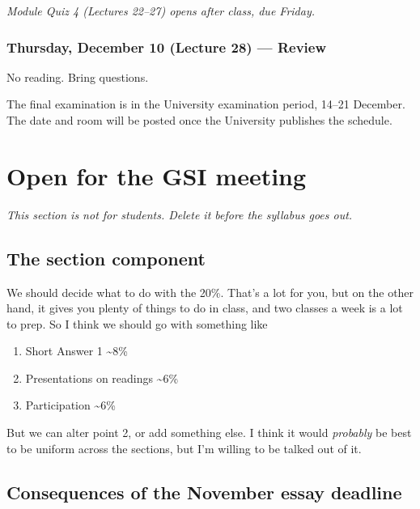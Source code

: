 \documentclass[
  letterpaper,
  DIV=11,
  numbers=noendperiod]{scrartcl}
\providecommand{\tightlist}{%
  \setlength{\itemsep}{0pt}\setlength{\parskip}{0pt}}
\begin{document}
\emph{Module Quiz 4 (Lectures 22--27) opens after class, due Friday.}

\subsubsection{Thursday, December 10 (Lecture 28) ---
Review}\label{thursday-december-10-lecture-28-review}

No reading. Bring questions.

The final examination is in the University examination period, 14--21
December. The date and room will be posted once the University publishes
the schedule.

\pagebreak

\section{Open for the GSI meeting}\label{open-for-the-gsi-meeting}

\emph{This section is not for students. Delete it before the syllabus
goes out.}

\subsection{The section component}\label{the-section-component}

We should decide what to do with the 20\%. That's a lot for you, but on
the other hand, it gives you plenty of things to do in class, and two
classes a week is a lot to prep. So I think we should go with something
like

\begin{enumerate}
\def\labelenumi{\arabic{enumi}.}
\tightlist
\item
  Short Answer 1 \textasciitilde8\%
\item
  Presentations on readings \textasciitilde6\%
\item
  Participation \textasciitilde6\%
\end{enumerate}

But we can alter point 2, or add something else. I think it would
\emph{probably} be best to be uniform across the sections, but I'm
willing to be talked out of it.

\subsection{Consequences of the November essay
deadline}\label{consequences-of-the-november-essay-deadline}
\end{document}
